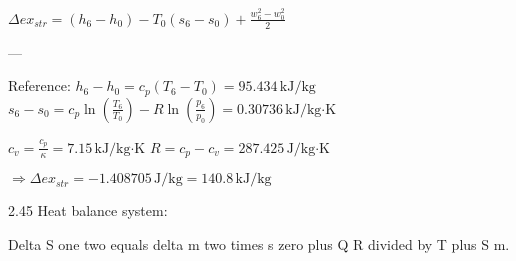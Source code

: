\( \Delta ex_{str} = (h_6 - h_0) - T_0 (s_6 - s_0) + \frac{w_6^2 - w_0^2}{2} \)  

---

Reference:  
\( h_6 - h_0 = c_p (T_6 - T_0) = 95.434 \, \text{kJ/kg} \)  
\( s_6 - s_0 = c_p \ln \left( \frac{T_6}{T_0} \right) - R \ln \left( \frac{p_6}{p_0} \right) = 0.30736 \, \text{kJ/kg·K} \)  

\( c_v = \frac{c_p}{\kappa} = 7.15 \, \text{kJ/kg·K} \)  
\( R = c_p - c_v = 287.425 \, \text{J/kg·K} \)  

\( \Rightarrow \Delta ex_{str} = -1.408705 \, \text{J/kg} = 140.8 \, \text{kJ/kg} \)

2.45 Heat balance system:  

Delta S one two equals delta m two times s zero plus Q R divided by T plus S m.
